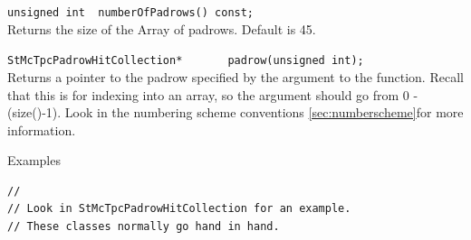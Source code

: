 \begin{Entry}
    \verb+unsigned int  numberOfPadrows() const;+\\
    Returns the size of the Array of padrows.  Default is 45.

    \verb+StMcTpcPadrowHitCollection*       padrow(unsigned int);+\\
    Returns a pointer to the padrow specified by the argument to the
    function.  Recall that this is for indexing into an array, so the
    argument should go from 0 - (size()-1).  Look in the
    numbering scheme conventions \ref{sec:numberscheme}for more information.

\item[Examples]
{\footnotesize
\begin{verbatim}
//
// Look in StMcTpcPadrowHitCollection for an example.
// These classes normally go hand in hand.
\end{verbatim}
}%
\end{Entry}

\clearpage
%
%
